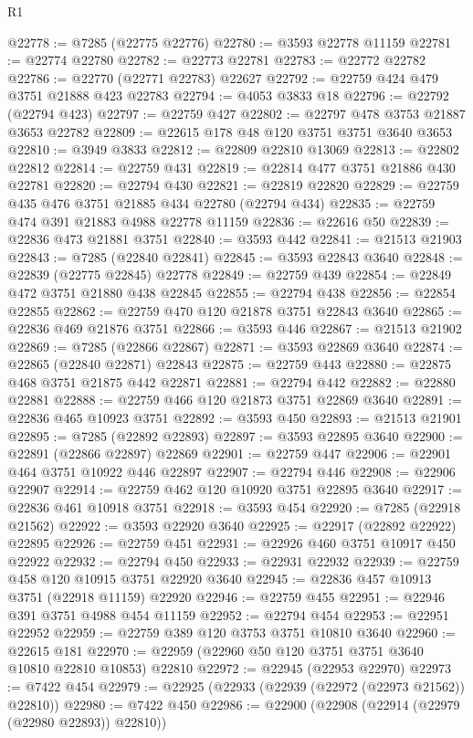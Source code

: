 \begin{lexlean}{R1}
\begin{coremodule}
@22778 := @7285 (@22775 @22776)
@22780 := @3593 @22778 @11159
@22781 := @22774 @22780
@22782 := @22773 @22781
@22783 := @22772 @22782
@22786 := @22770 (@22771 @22783) @22627
@22792 := @22759 @424 @479 @3751 @21888 @423 @22783
@22794 := @4053 @3833 @18
@22796 := @22792 (@22794 @423)
@22797 := @22759 @427
@22802 := @22797 @478 @3753 @21887 @3653 @22782
@22809 := @22615 @178 @48 @120 @3751 @3751 @3640 @3653
@22810 := @3949 @3833
@22812 := @22809 @22810 @13069
@22813 := @22802 @22812
@22814 := @22759 @431
@22819 := @22814 @477 @3751 @21886 @430 @22781
@22820 := @22794 @430
@22821 := @22819 @22820
@22829 := @22759 @435 @476 @3751 @21885 @434 @22780 (@22794 @434)
@22835 := @22759 @474 @391 @21883 @4988 @22778 @11159
@22836 := @22616 @50
@22839 := @22836 @473 @21881 @3751
@22840 := @3593 @442
@22841 := @21513 @21903
@22843 := @7285 (@22840 @22841)
@22845 := @3593 @22843 @3640
@22848 := @22839 (@22775 @22845) @22778
@22849 := @22759 @439
@22854 := @22849 @472 @3751 @21880 @438 @22845
@22855 := @22794 @438
@22856 := @22854 @22855
@22862 := @22759 @470 @120 @21878 @3751 @22843 @3640
@22865 := @22836 @469 @21876 @3751
@22866 := @3593 @446
@22867 := @21513 @21902
@22869 := @7285 (@22866 @22867)
@22871 := @3593 @22869 @3640
@22874 := @22865 (@22840 @22871) @22843
@22875 := @22759 @443
@22880 := @22875 @468 @3751 @21875 @442 @22871
@22881 := @22794 @442
@22882 := @22880 @22881
@22888 := @22759 @466 @120 @21873 @3751 @22869 @3640
@22891 := @22836 @465 @10923 @3751
@22892 := @3593 @450
@22893 := @21513 @21901
@22895 := @7285 (@22892 @22893)
@22897 := @3593 @22895 @3640
@22900 := @22891 (@22866 @22897) @22869
@22901 := @22759 @447
@22906 := @22901 @464 @3751 @10922 @446 @22897
@22907 := @22794 @446
@22908 := @22906 @22907
@22914 := @22759 @462 @120 @10920 @3751 @22895 @3640
@22917 := @22836 @461 @10918 @3751
@22918 := @3593 @454
@22920 := @7285 (@22918 @21562)
@22922 := @3593 @22920 @3640
@22925 := @22917 (@22892 @22922) @22895
@22926 := @22759 @451
@22931 := @22926 @460 @3751 @10917 @450 @22922
@22932 := @22794 @450
@22933 := @22931 @22932
@22939 := @22759 @458 @120 @10915 @3751 @22920 @3640
@22945 := @22836 @457 @10913 @3751 (@22918 @11159) @22920
@22946 := @22759 @455
@22951 := @22946 @391 @3751 @4988 @454 @11159
@22952 := @22794 @454
@22953 := @22951 @22952
@22959 := @22759 @389 @120 @3753 @3751 @10810 @3640
@22960 := @22615 @181
@22970 := @22959 (@22960 @50 @120 @3751 @3751 @3640 @10810 @22810 @10853) @22810
@22972 := @22945 (@22953 @22970)
@22973 := @7422 @454
@22979 := @22925 (@22933 (@22939 (@22972 (@22973 @21562)) @22810))
@22980 := @7422 @450
@22986 := @22900 (@22908 (@22914 (@22979 (@22980 @22893)) @22810))

\end{coremodule}
\end{lexlean}
